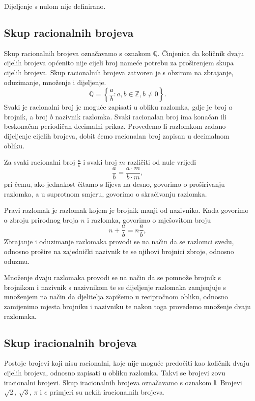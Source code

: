 Dijeljenje s nulom nije definirano.

\subsection{Skup racionalnih brojeva}\label{subsec:skup-racionalnih-brojeva}
Skup racionalnih brojeva označavamo s oznakom $\mathbb{Q}$.
Činjenica da količnik dvaju cijelih brojeva općenito nije cijeli broj nameće potrebu za proširenjem skupa cijelih brojeva.
Skup racionalnih brojeva zatvoren je s obzirom na zbrajanje, oduzimanje, množenje i dijeljenje.
\[ \mathbb{Q}=\left\{\frac{a}{b} : a,b \in \mathbb{Z}, b \neq 0 \right\}. \]
Svaki je racionalni broj je moguće zapisati u obliku razlomka, gdje je broj $a$ brojnik, a broj $b$ nazivnik razlomka.
Svaki racionalan broj ima konačan ili beskonačan periodičan decimalni prikaz.
Provedemo li razlomkom zadano dijeljenje cijelih brojeva, dobit ćemo racionalan broj zapisan u decimalnom obliku.

Za svaki racionalni broj $\displaystyle \frac{a}{b}$ i svaki broj $m$ različiti od nule vrijedi
\[ \frac{a}{b} = \frac{a \cdot m}{b \cdot m}, \]
pri čemu, ako jednakost čitamo s lijeva na desno, govorimo o proširivanju razlomka, a u suprotnom smjeru, govorimo o skraćivanju razlomka.

Pravi razlomak je razlomak kojem je brojnik manji od nazivnika.
Kada govorimo o zbroju prirodnog broja $n$ i razlomka, govorimo o mješovitom broju
\[ n + \frac{a}{b} = n\frac{a}{b}, \]
Zbrajanje i oduzimanje razlomaka provodi se na način da se razlomci svedu, odnosno prošire na zajednički nazivnik te se njihovi brojnici zbroje, odnosno oduzmu.

Množenje dvaju razlomaka provodi se na način da se pomnože brojnik s brojnikom i nazivnik s nazivnikom te se dijeljenje razlomaka zamjenjuje s množenjem na način da djelitelja zapišemo u recipročnom obliku, odnosno zamijenimo mjesta brojniku i nazivniku te nakon toga provedemo množenje dvaju razlomaka.

\subsection{Skup iracionalnih brojeva}\label{subsec:skup-iracionalnih-brojeva}
Postoje brojevi koji nisu racionalni, koje nije moguće predočiti kao količnik dvaju cijelih brojeva, odnosno zapisati u obliku razlomka.
Takvi se brojevi zovu iracionalni brojevi.
Skup iracionalnih brojeva označavamo s oznakom $\mathbb{I}$.
Brojevi $\sqrt{2}$, $\sqrt{3}$, $\pi$ i $e$  primjeri su nekih iracionalnih brojeva.

